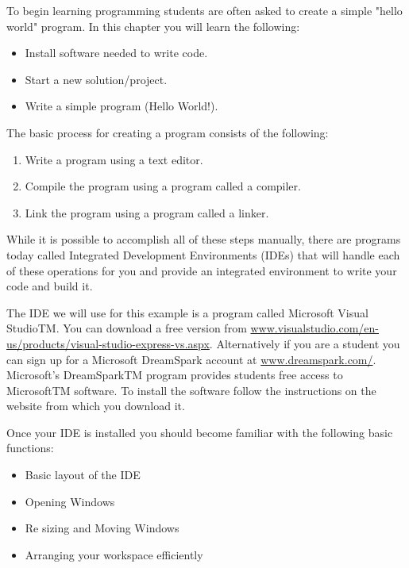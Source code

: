 
To begin learning programming students are often asked to create a simple "hello world" program. In this chapter you will learn the following:


\begin{itemize}
\item Install software needed to write code.
\item Start a new solution/project.
\item Write a simple program (Hello World!).
\end{itemize}

The basic process for creating a program consists of the following:
\begin{enumerate}
\item Write a program using a text editor.
\item Compile the program using a program called a compiler.
\item Link the program using a program called a linker.
\end{enumerate}
While it is possible to accomplish all of these steps manually, there are programs today called Integrated Development Environments (IDEs) that will handle each of these operations for you and provide an integrated environment to write your code and build it. 

The IDE we will use for this example is a program called Microsoft Visual Studio{TM}. 
You can download a free version from \url{www.visualstudio.com/en-us/products/visual-studio-express-vs.aspx}. 
Alternatively if you are a student you can sign up for a Microsoft DreamSpark account at \url{www.dreamspark.com/}.
Microsoft's DreamSpark{TM} program provides students free access to Microsoft{TM} software. To install the software follow the instructions on the website from which you download it.
 

Once your IDE is installed you should become familiar with the following basic functions:

\begin{itemize}
\item Basic layout of the IDE
\item Opening Windows
\item Re sizing and Moving Windows
\item Arranging your workspace efficiently
\end{itemize}

